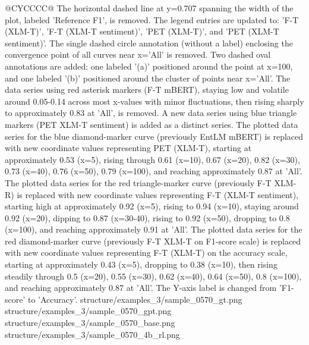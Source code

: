 \begin{table}[t]
\begin{tabularx}{\textwidth}{@{}CYCCCC@{}}
    {The horizontal dashed line at y=0.707 spanning the width of the plot, labeled 'Reference F1', is removed. The legend entries are updated to: 'F-T (XLM-T)', 'F-T (XLM-T sentiment)', 'PET (XLM-T)', and 'PET (XLM-T sentiment)'. The single dashed circle annotation (without a label) enclosing the convergence point of all curves near x='All' is removed. Two dashed oval annotations are added: one labeled '(a)' positioned around the point at x=100, and one labeled '(b)' positioned around the cluster of points near x='All'. The data series using red asterisk markers (F-T mBERT), staying low and volatile around 0.05-0.14 across most x-values with minor fluctuations, then rising sharply to approximately 0.83 at 'All', is removed. A new data series using blue triangle markers (PET XLM-T sentiment) is added as a distinct series. The plotted data series for the blue diamond-marker curve (previously EntLM mBERT) is replaced with new coordinate values representing PET (XLM-T), starting at approximately 0.53 (x=5), rising through 0.61 (x=10), 0.67 (x=20), 0.82 (x=30), 0.73 (x=40), 0.76 (x=50), 0.79 (x=100), and reaching approximately 0.87 at 'All'. The plotted data series for the red triangle-marker curve (previously F-T XLM-R) is replaced with new coordinate values representing F-T (XLM-T sentiment), starting high at approximately 0.92 (x=5), rising to 0.94 (x=10), staying around 0.92 (x=20), dipping to 0.87 (x=30-40), rising to 0.92 (x=50), dropping to 0.8 (x=100), and reaching approximately 0.91 at 'All'. The plotted data series for the red diamond-marker curve (previously F-T XLM-T on F1-score scale) is replaced with new coordinate values representing F-T (XLM-T) on the accuracy scale, starting at approximately 0.43 (x=5), dropping to 0.38 (x=10), then rising steadily through 0.5 (x=20), 0.55 (x=30), 0.62 (x=40), 0.64 (x=50), 0.8 (x=100), and reaching approximately 0.87 at 'All'. The Y-axis label is changed from 'F1-score' to 'Accuracy'.}
    {structure/examples_3/sample_0570_gt.png}
    {structure/examples_3/sample_0570_gpt.png}
    {structure/examples_3/sample_0570_base.png}
    {structure/examples_3/sample_0570_4b_rl.png}
    \bottomrule
\end{tabularx}
\end{table}